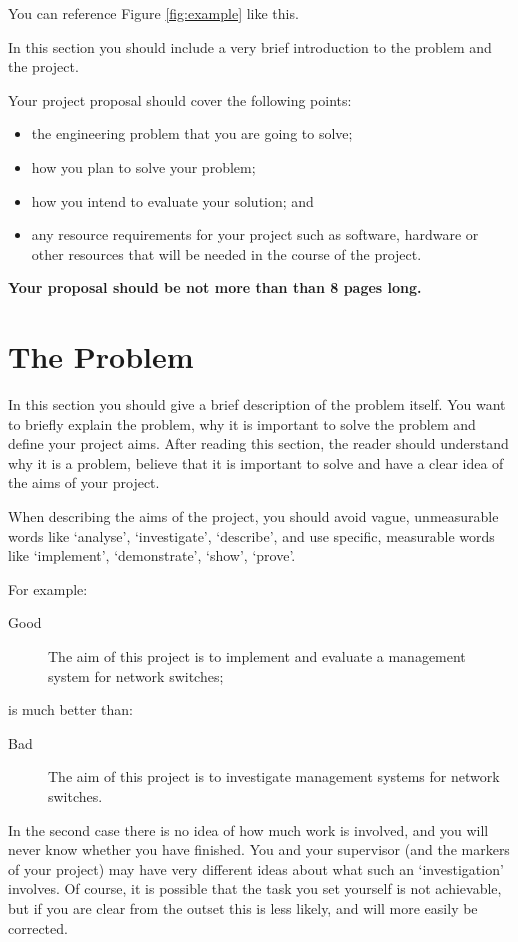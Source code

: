 \documentclass[11pt, a4paper, oneside, openright]{article}
\begin{document}
You can reference Figure \ref{fig:example} like this.

In this section you should include a very brief introduction to the problem and
the project.

Your project proposal should cover the following points:

\begin{itemize}
\item the engineering problem that you are going to solve;
\item how you plan to solve your problem;
\item how you intend to evaluate your solution; and
\item any resource requirements for your project such as software,
  hardware or other resources that will be needed in the course of the project.
\end{itemize}

\textbf{Your proposal should be not more than than 8 pages long.} 

\section{The Problem}

In this section you should give a brief description of the problem itself. You
want to briefly explain the problem, why it is important to solve the problem
and define your project aims. After reading this section, the reader should
understand why it is a problem, believe that it is important to solve and have a
clear idea of the aims of your project.

When describing the aims of the project, you should avoid vague, unmeasurable
words like `analyse', `investigate', `describe', and use specific, measurable
words like `implement', `demonstrate', `show', `prove'.

For example:

\begin{description}
    \item[Good] The aim of this project is to implement and evaluate a
        management system for network switches;
\end{description}
is much better than:
\begin{description}
    \item[Bad] The aim of this project is to investigate management systems for
        network switches.
\end{description}

In the second case there is no idea of how much work is involved, and you will
never know whether you have finished. You and your supervisor (and the markers
of your project) may have very different ideas about what such an
`investigation' involves. Of course, it is possible that the task you set
yourself is not achievable, but if you are clear from the outset this is less
likely, and will more easily be corrected.
\end{document}
